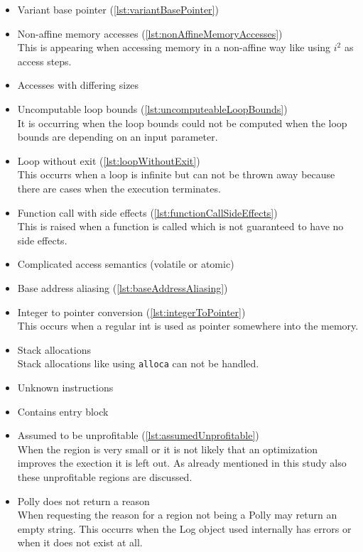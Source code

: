 \begin{itemize}
    \item Variant base pointer (\autoref{lst:variantBasePointer})\\
    \item Non-affine memory accesses (\autoref{lst:nonAffineMemoryAccesses})\\
        This is appearing when accessing memory in a non-affine way like using \(i^2\) as access steps.
    \item Accesses with differing sizes\\
    \item Uncomputable loop bounds (\autoref{lst:uncomputeableLoopBounds})\\
        It is occurring when the loop bounds could not be computed \eg when the loop bounds are depending on an input parameter.
    \item Loop without exit (\autoref{lst:loopWithoutExit})\\
        This occurrs when a loop is infinite but can not be thrown away because there are cases when the execution terminates.
    \item Function call with side effects (\autoref{lst:functionCallSideEffects})\\
        This is raised when a function is called which is not guaranteed to have no side effects.
    \item Complicated access semantics (volatile or atomic)\\
    \item Base address aliasing (\autoref{lst:baseAddressAliasing})\\
    \item Integer to pointer conversion (\autoref{lst:integerToPointer})\\
        This occurs when a regular int is used as pointer somewhere into the memory.
    \item Stack allocations\\
        Stack allocations like using \texttt{alloca} can not be handled.
    \item Unknown instructions\\
    \item Contains entry block\\
    \item Assumed to be unprofitable (\autoref{lst:assumedUnprofitable})\\
        When the region is very small or it is not likely that an optimization improves the exection it is left out.
        As already mentioned in this study also these unprofitable regions are discussed.
    \item Polly does not return a reason\\
        When requesting the reason for a region not being a \scop Polly may return an empty string.
        This occurrs when the Log object used internally has errors or when it does not exist at all.
\end{itemize}

